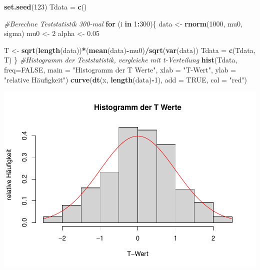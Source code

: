 \documentclass[]{article}
\newenvironment{Shaded}{\begin{snugshade}}{\end{snugshade}}
\newcommand{\CommentTok}[1]{\textcolor[rgb]{0.56,0.35,0.01}{\textit{#1}}}
\newcommand{\ControlFlowTok}[1]{\textcolor[rgb]{0.13,0.29,0.53}{\textbf{#1}}}
\newcommand{\DataTypeTok}[1]{\textcolor[rgb]{0.13,0.29,0.53}{#1}}
\newcommand{\DecValTok}[1]{\textcolor[rgb]{0.00,0.00,0.81}{#1}}
\newcommand{\FloatTok}[1]{\textcolor[rgb]{0.00,0.00,0.81}{#1}}
\newcommand{\KeywordTok}[1]{\textcolor[rgb]{0.13,0.29,0.53}{\textbf{#1}}}
\newcommand{\NormalTok}[1]{#1}
\newcommand{\OperatorTok}[1]{\textcolor[rgb]{0.81,0.36,0.00}{\textbf{#1}}}
\newcommand{\OtherTok}[1]{\textcolor[rgb]{0.56,0.35,0.01}{#1}}
\newcommand{\StringTok}[1]{\textcolor[rgb]{0.31,0.60,0.02}{#1}}
\begin{document}
\begin{Shaded}
\begin{Highlighting}[]
\KeywordTok{set.seed}\NormalTok{(}\DecValTok{123}\NormalTok{)}
\NormalTok{Tdata =}\StringTok{ }\KeywordTok{c}\NormalTok{()}

\CommentTok{#Berechne Teststatistik 300-mal}
\ControlFlowTok{for}\NormalTok{ (i }\ControlFlowTok{in} \DecValTok{1}\OperatorTok{:}\DecValTok{300}\NormalTok{)\{}
\NormalTok{  data <-}\StringTok{ }\KeywordTok{rnorm}\NormalTok{(}\DecValTok{1000}\NormalTok{, mu0, sigma)}
\NormalTok{  mu0 <-}\StringTok{ }\DecValTok{2}
\NormalTok{  alpha <-}\StringTok{ }\FloatTok{0.05}

\NormalTok{  T <-}\StringTok{ }\KeywordTok{sqrt}\NormalTok{(}\KeywordTok{length}\NormalTok{(data))}\OperatorTok{*}\NormalTok{(}\KeywordTok{mean}\NormalTok{(data)}\OperatorTok{-}\NormalTok{mu0)}\OperatorTok{/}\KeywordTok{sqrt}\NormalTok{(}\KeywordTok{var}\NormalTok{(data))}
\NormalTok{  Tdata =}\StringTok{ }\KeywordTok{c}\NormalTok{(Tdata, T)}
\NormalTok{\}}
\CommentTok{#Histogramm der Teststatistik, vergleiche mit t-Verteilung}
\KeywordTok{hist}\NormalTok{(Tdata, }\DataTypeTok{freq=}\OtherTok{FALSE}\NormalTok{, }\DataTypeTok{main =} \StringTok{"Histogramm der T Werte"}\NormalTok{,}
     \DataTypeTok{xlab =} \StringTok{"T-Wert"}\NormalTok{, }\DataTypeTok{ylab =} \StringTok{"relative Häufigkeit"}\NormalTok{)}
\KeywordTok{curve}\NormalTok{(}\KeywordTok{dt}\NormalTok{(x, }\KeywordTok{length}\NormalTok{(data)}\OperatorTok{-}\DecValTok{1}\NormalTok{), }\DataTypeTok{add =} \OtherTok{TRUE}\NormalTok{, }\DataTypeTok{col =} \StringTok{"red"}\NormalTok{)}
\end{Highlighting}
\end{Shaded}

\includegraphics{Test_files/figure-latex/unnamed-chunk-5-1.pdf}
\end{document}
